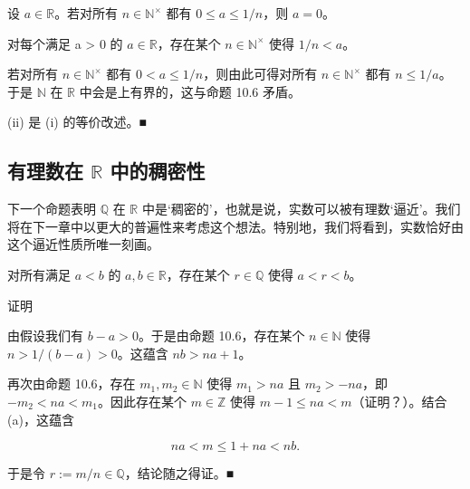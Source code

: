 \begin{corollary}

\begin{subitems}
\item

设 $ a \in \mathbb{R} $。若对所有 $ n \in \mathbb{N}^\times $ 都有 $ 0 \leq a \leq 1/n $，则 $ a = 0 $。

\item

对每个满足 a > 0 的 $ a \in \mathbb{R} $，存在某个 $ n \in \mathbb{N}^\times $ 使得 $ 1/n < a $。

\proofhead
若对所有 $ n \in \mathbb{N}^\times $ 都有 $ 0 < a \leq 1/n $，则由此可得对所有 $ n \in \mathbb{N}^\times $ 都有 $ n \leq 1/a $。于是 $ \mathbb{N} $ 在 $ \mathbb{R} $ 中会是上有界的，这与命题 10.6 矛盾。
\end{subitems}

(ii) 是 (i) 的等价改述。■

\end{corollary}

\subsection*{有理数在 $ \mathbb{R} $ 中的稠密性}

下一个命题表明 $ \mathbb{Q} $ 在 $ \mathbb{R} $ 中是‘稠密的’，也就是说，实数可以被有理数‘逼近’。我们将在下一章中以更大的普遍性来考虑这个想法。特别地，我们将看到，实数恰好由这个逼近性质所唯一刻画。

\begin{proposition}

对所有满足 $ a < b $ 的 $ a, b \in \mathbb{R} $，存在某个 $ r \in \mathbb{Q} $ 使得 $ a < r < b $。

证明

\begin{items}
\item

由假设我们有 $ b - a > 0 $。于是由命题 10.6，存在某个 $ n \in \mathbb{N} $ 使得 $ n > 1/(b - a) > 0 $。这蕴含 $ nb > na + 1 $。

\item

再次由命题 10.6，存在 $ m_1, m_2 \in \mathbb{N} $ 使得 $ m_1 > na $ 且 $ m_2 > -na $，即 $ -m_2 < na < m_1 $。因此存在某个 $ m \in \mathbb{Z} $ 使得 $ m - 1 \leq na < m $（证明？）。结合 (a)，这蕴含

\[
n a<m\leq1+n a<n b.
\]

于是令 $ r := m/n \in \mathbb{Q} $，结论随之得证。■

\end{items}

\end{proposition}

